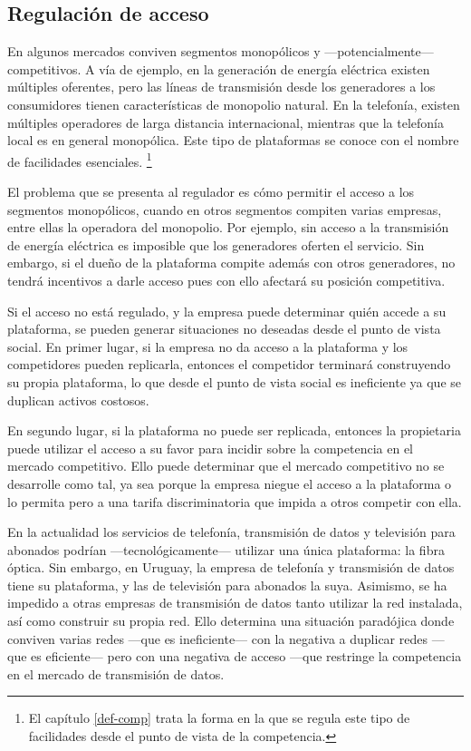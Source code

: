 \documentclass[
  12pt,
  spanish,
]{book}
\begin{document}
\hypertarget{regulaciuxf3n-de-acceso}{%
\subsection{Regulación de acceso}\label{regulaciuxf3n-de-acceso}}

En algunos mercados conviven segmentos monopólicos y ---potencialmente--- competitivos. A vía de ejemplo, en la generación de energía eléctrica existen múltiples oferentes, pero las líneas de transmisión desde los generadores a los consumidores tienen características de monopolio natural. En la telefonía, existen múltiples operadores de larga distancia internacional, mientras que la telefonía local es en general monopólica. Este tipo de plataformas se conoce con el nombre de facilidades esenciales.
\footnote{El capítulo \ref{def-comp} trata la forma en la que se regula este tipo de facilidades desde el punto de vista de la competencia.}

El problema que se presenta al regulador es cómo permitir el acceso a los segmentos monopólicos, cuando en otros segmentos compiten varias empresas, entre ellas la operadora del monopolio. Por ejemplo, sin acceso a la transmisión de energía eléctrica es imposible que los generadores oferten el servicio. Sin embargo, si el dueño de la plataforma compite además con otros generadores, no tendrá incentivos a darle acceso pues con ello afectará su posición competitiva.

Si el acceso no está regulado, y la empresa puede determinar quién accede a su plataforma, se pueden generar situaciones no deseadas desde el punto de vista social. En primer lugar, si la empresa no da acceso a la plataforma y los competidores pueden replicarla, entonces el competidor terminará construyendo su propia plataforma, lo que desde el punto de vista social es ineficiente ya que se duplican activos costosos.

En segundo lugar, si la plataforma no puede ser replicada, entonces la propietaria puede utilizar el acceso a su favor para incidir sobre la competencia en el mercado competitivo. Ello puede determinar que el mercado competitivo no se desarrolle como tal, ya sea porque la empresa niegue el acceso a la plataforma o lo permita pero a una tarifa discriminatoria que impida a otros competir con ella.

En la actualidad los servicios de telefonía, transmisión de datos y televisión para abonados podrían ---tecnológicamente--- utilizar una única plataforma: la fibra óptica. Sin embargo, en Uruguay, la empresa de telefonía y transmisión de datos tiene su plataforma, y las de televisión para abonados la suya. Asimismo, se ha impedido a otras empresas de transmisión de datos tanto utilizar la red instalada, así como construir su propia red. Ello determina una situación paradójica donde conviven varias redes ---que es ineficiente--- con la negativa a duplicar redes ---que es eficiente--- pero con una negativa de acceso ---que restringe la competencia en el mercado de transmisión de datos.
\end{document}
